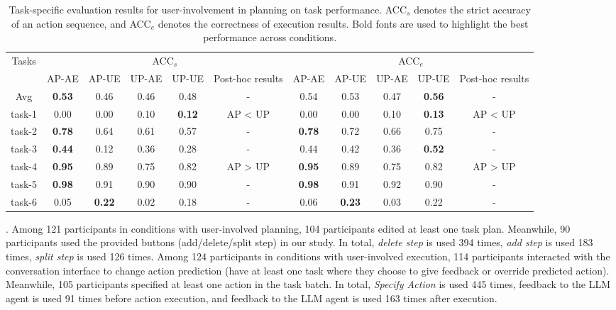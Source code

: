 \begin{table*}[h]
	\centering
	\caption{Task-specific evaluation results for user-involvement in planning on task performance. ACC$_s$ denotes the strict accuracy of an action sequence, and ACC$_e$ denotes the correctness of execution results. Bold fonts are used to highlight the best performance across conditions.}
	\label{tab:h2-res}
    \begin{small}
	\begin{tabular}{c | c c c  c | c | c  c c c | c}
	    \hline
        \multirow{2}{*}{Tasks}&     \multicolumn{5}{c|}{ACC$_s$}&  \multicolumn{5}{c}{ACC$_e$}\\
        \cline{2-11}
        & AP-AE& AP-UE& UP-AE& UP-UE& Post-hoc results& AP-AE& AP-UE& UP-AE& UP-UE& Post-hoc results\\
        \hline 
        \hline
        Avg& \textbf{0.53} & 0.46 & 0.46 & 0.48 & - & 0.54 & 0.53 & 0.47 & \textbf{0.56} & -\\
        \hline
        task-1& 0.00 & 0.00 & 0.10 & \textbf{0.12} & AP < UP & 0.00 & 0.00 & 0.10 & \textbf{0.13} & AP < UP\\
        task-2 &\textbf{0.78} & 0.64 & 0.61 & 0.57 & - & \textbf{0.78} & 0.72 & 0.66 & 0.75 & - \\
        task-3 & \textbf{0.44} & 0.12 & 0.36 & 0.28 & - & 0.44 & 0.42 & 0.36 & \textbf{0.52} & - \\
        task-4 & \textbf{0.95} & 0.89 & 0.75 & 0.82 & AP > UP & \textbf{0.95} & 0.89 & 0.75 & 0.82 & AP > UP \\
        task-5 & \textbf{0.98} & 0.91 & 0.90 & 0.90 & - & \textbf{0.98} & 0.91 & 0.92 & 0.90 & - \\
        task-6 & 0.05 & \textbf{0.22} & 0.02 & 0.18 & - & 0.06 & \textbf{0.23} & 0.03 & 0.22 & - \\
    \hline
	\end{tabular}
 \end{small}
\end{table*}

. Among 121 participants in conditions with user-involved planning, 104 participants edited at least one task plan. Meanwhile, 90 participants used the provided buttons (\ie add/delete/split step) in our study. In total, \textit{delete step} is used 394 times, \textit{add step} is used 183 times, \textit{split step} is used 126 times. Among 124 participants in conditions with user-involved execution, 114 participants interacted with the conversation interface to change action prediction (\ie have at least one task where they choose to give feedback or override predicted action). 
Meanwhile, 105 participants specified at least one action in the task batch. 
In total, \textit{Specify Action} is used 445 times, feedback to the LLM agent is used 91 times before action execution, and feedback to the LLM agent is used 163 times after execution.


